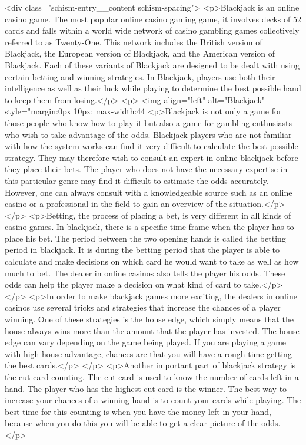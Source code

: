 {		<div class="schism-entry__content schism-spacing">			<p>Blackjack is an online casino game. The most popular online casino gaming game, it involves decks of 52 cards and falls within a world wide network of casino gambling games collectively referred to as Twenty-One. This network includes the British version of Blackjack, the European version of Blackjack, and the American version of Blackjack. Each of these variants of Blackjack are designed to be dealt with using certain betting and winning strategies. In Blackjack, players use both their intelligence as well as their luck while playing to determine the best possible hand to keep them from losing.</p>
<p> <img align="left" alt="Blackjack" style="margin:0px 10px; max-width:44%
<p>Blackjack is not only a game for those people who know how to play it but also a game for gambling enthusiasts who wish to take advantage of the odds. Blackjack players who are not familiar with how the system works can find it very difficult to calculate the best possible strategy. They may therefore wish to consult an expert in online blackjack before they place their bets. The player who does not have the necessary expertise in this particular genre may find it difficult to estimate the odds accurately. However, one can always consult with a knowledgeable source such as an online casino or a professional in the field to gain an overview of the situation.</p>
</p>
<p>Betting, the process of placing a bet, is very different in all kinds of casino games. In blackjack, there is a specific time frame when the player has to place his bet. The period between the two opening hands is called the betting period in blackjack. It is during the betting period that the player is able to calculate and make decisions on which card he would want to take as well as how much to bet. The dealer in online casinos also tells the player his odds. These odds can help the player make a decision on what kind of card to take.</p>
</p>
<p>In order to make blackjack games more exciting, the dealers in online casinos use several tricks and strategies that increase the chances of a player winning. One of these strategies is the house edge, which simply means that the house always wins more than the amount that the player has invested. The house edge can vary depending on the game being played. If you are playing a game with high house advantage, chances are that you will have a rough time getting the best cards.</p>
</p>
<p>Another important part of blackjack strategy is the cut card counting. The cut card is used to know the number of cards left in a hand. The player who has the highest cut card is the winner. The best way to increase your chances of a winning hand is to count your cards while playing. The best time for this counting is when you have the money left in your hand, because when you do this you will be able to get a clear picture of the odds.</p>
}
